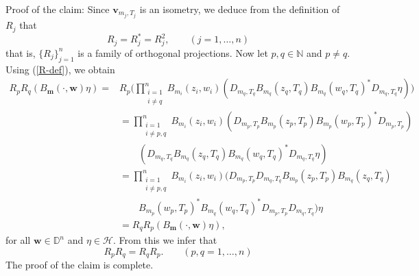 \documentclass[12pt]{amsart}
\begin{document}
{\noindent}\textsf{Proof of the claim:} Since ${\bm{v}}_{m_j, T_j}$ is an
isometry, we deduce from the definition of $R_j$ that \[R_j = R_j^*
= R_j^2, \quad \quad (j = 1, \ldots, n)\]that is, $\{R_j\}_{j=1}^n$
is a family of orthogonal projections. Now let $p, q \in {\mathbb{N}}$ and $p
\neq q$. Using (\ref{R-def}), we obtain
\[\begin{split} R_p R_q
(B_{\bm{m}}(\cdot, {\bm{w}}) \eta) = & R_p \Big(\prod_{\substack{{i=1}\\i \neq
q}}^n B_{m_i}(z_i, w_i) ( D_{m_q, T_q} B_{m_q}(z_q, T_q)
B_{m_q}(w_q, T_q)^* D_{m_q, T_q} \eta) \Big) \\& =
\prod_{\substack{{i=1}\\i \neq p, q}}^n B_{m_i}(z_i, w_i) (D_{m_p,
T_p} B_{m_p}(z_p, T_p) B_{m_p}(w_p, T_p)^* D_{m_p, T_p}) \\ & \quad
\quad(D_{m_q, T_q} B_{m_q}(z_q, T_q) B_{m_q}(w_q, T_q)^* D_{m_q,
T_q} \eta) \\& = \prod_{\substack{{i=1}\\i \neq p, q}}^n
B_{m_i}(z_i, w_i) (D_{m_p, T_p} D_{m_q, T_q} B_{m_p}(z_p, T_p)
B_{m_q}(z_q, T_q)
\\ & \quad \quad  B_{m_p}(w_p, T_p)^* B_{m_q}(w_q, T_q)^* D_{m_p,
T_p}D_{m_q, T_q})\eta \\& = R_q R_p (B_{\bm{m}}(\cdot, {\bm{w}}) \eta),
\end{split}\]
for all ${\bm{w}} \in {\mathbb{D}}^n$ and $\eta \in {\mathcal{H}}$. From this we infer that
\[R_p R_q = R_q R_p. \quad \quad (p, q = 1, \ldots, n)\]The proof of
the claim is complete.
\end{document}
